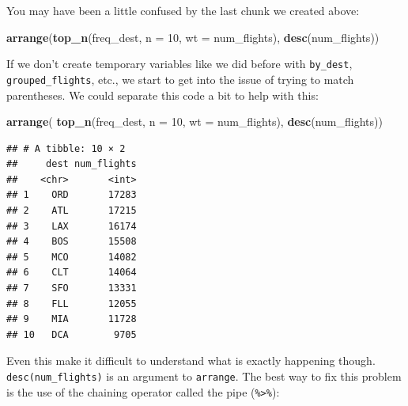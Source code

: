 \documentclass[]{tufte-book}
\newenvironment{Shaded}{\begin{snugshade}}{\end{snugshade}}
\newcommand{\KeywordTok}[1]{\textcolor[rgb]{0.13,0.29,0.53}{\textbf{{#1}}}}
\newcommand{\DataTypeTok}[1]{\textcolor[rgb]{0.13,0.29,0.53}{{#1}}}
\newcommand{\DecValTok}[1]{\textcolor[rgb]{0.00,0.00,0.81}{{#1}}}
\newcommand{\StringTok}[1]{\textcolor[rgb]{0.31,0.60,0.02}{{#1}}}
\newcommand{\NormalTok}[1]{{#1}}
\begin{document}
You may have been a little confused by the last chunk we created above:

\begin{Shaded}
\begin{Highlighting}[]
\KeywordTok{arrange}\NormalTok{(}\KeywordTok{top_n}\NormalTok{(freq_dest, }\DataTypeTok{n =} \DecValTok{10}\NormalTok{, }\DataTypeTok{wt =} \NormalTok{num_flights), }\KeywordTok{desc}\NormalTok{(num_flights))}
\end{Highlighting}
\end{Shaded}

If we don't create temporary variables like we did before with
\texttt{by\_dest}, \texttt{grouped\_flights}, etc., we start to get into
the issue of trying to match parentheses. We could separate this code a
bit to help with this:

\begin{Shaded}
\begin{Highlighting}[]
\KeywordTok{arrange}\NormalTok{(}
  \KeywordTok{top_n}\NormalTok{(freq_dest, }
        \DataTypeTok{n =} \DecValTok{10}\NormalTok{,}
        \DataTypeTok{wt =} \NormalTok{num_flights), }
  \KeywordTok{desc}\NormalTok{(num_flights))}
\end{Highlighting}
\end{Shaded}

\begin{verbatim}
## # A tibble: 10 × 2
##     dest num_flights
##    <chr>       <int>
## 1    ORD       17283
## 2    ATL       17215
## 3    LAX       16174
## 4    BOS       15508
## 5    MCO       14082
## 6    CLT       14064
## 7    SFO       13331
## 8    FLL       12055
## 9    MIA       11728
## 10   DCA        9705
\end{verbatim}

Even this make it difficult to understand what is exactly happening
though. \texttt{desc(num\_flights)} is an argument to \texttt{arrange}.
The best way to fix this problem is the use of the chaining operator
called the pipe (\texttt{\%\textgreater{}\%}):

\begin{Shaded}
\end{Shaded}
\end{document}
